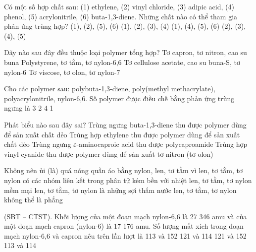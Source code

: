 \documentclass[11pt,a4paper]{article}
\def\loigiai#1{}
\begin{document}
\begin{ex}
Có một số hợp chất sau: (1) ethylene, (2) vinyl chloride, (3) adipic acid, (4) phenol, (5) acrylonitrile, (6) buta-1,3-diene. Những chất nào có thể tham gia phản ứng trùng hợp?
\choice
{(1), (2), (5), (6)}
{(1), (2), (3), (4)}
{(1), (4), (5), (6)}
{(2), (3), (4), (5)}
\loigiai{}
\end{ex}

\begin{ex}
Dãy nào sau đây đều thuộc loại polymer tổng hợp?
\choice
{Tơ capron, tơ nitron, cao su buna}
{Polystyrene, tơ tằm, tơ nylon-6,6}
{Tơ cellulose acetate, cao su buna-S, tơ nylon-6}
{Tơ viscose, tơ olon, tơ nylon-7}
\loigiai{}
\end{ex}

\begin{ex}
Cho các polymer sau: polybuta-1,3-diene, poly(methyl methacrylate), polyacrylonitrile, nylon-6,6. Số polymer được điều chế bằng phản ứng trùng ngưng là
\choice
{3}
{2}
{4}
{1}
\loigiai{}
\end{ex}

\begin{ex}
Phát biểu nào sau đây sai?
\choice
{Trùng ngưng buta-1,3-diene thu được polymer dùng để sản xuất chất dẻo}
{Trùng hợp ethylene thu được polymer dùng để sản xuất chất dẻo}
{Trùng ngưng $\varepsilon$-aminocaproic acid thu được polycaproamide}
{Trùng hợp vinyl cyanide thu được polymer dùng để sản xuất tơ nitron (tơ olon)}
\loigiai{}
\end{ex}

\begin{ex}
Không nên ủi (là) quá nóng quần áo bằng nylon, len, tơ tằm vì
\choice
{len, tơ tằm, tơ nylon có các nhóm liên kết trong phân tử kém bền với nhiệt}
{len, tơ tằm, tơ nylon mềm mại}
{len, tơ tằm, tơ nylon là những sợi thấm nước}
{len, tơ tằm, tơ nylon không thể là phẳng}
\loigiai{}
\end{ex}

\begin{ex}
(SBT -- CTST). Khối lượng của một đoạn mạch nylon-6,6 là 27 346 amu và của một đoạn mạch capron (nylon-6) là 17 176 amu. Số lượng mắt xích trong đoạn mạch nylon-6,6 và capron nêu trên lần lượt là
\choice
{113 và 152}
{121 và 114}
{121 và 152}
{113 và 114}
\loigiai{}
\end{ex}
\end{document}
